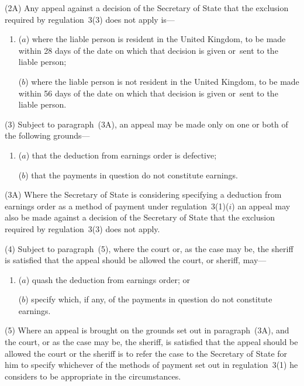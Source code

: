 \documentclass[12pt,a4paper]{article}
\begin{document}
(2A) Any appeal against a decision of the Secretary of State that the exclusion required by regulation~3(3) does not apply is—
\begin{enumerate}\item[]
($a$) where the liable person is resident in the United Kingdom, to be made within 28 days of the date on which that decision is given or~sent to the liable person;

($b$) where the liable person is not resident in the United Kingdom, to be made within 56 days of the date on which that decision is given or~sent to the liable person.
\end{enumerate}

(3) 
Subject to paragraph~(3A),  %
an appeal may be made only on one or both of the following grounds—
\begin{enumerate}\item[]
($a$) that the deduction from earnings order is defective;

($b$) that the payments in question do not constitute earnings.
\end{enumerate}

(3A) Where the Secretary of State is considering specifying a deduction from earnings order as a method of payment under regulation~3(1)($i$)  an appeal may also be made against a decision of the Secretary of State that the exclusion required by regulation~3(3) does not apply.

(4) 
Subject to paragraph~(5),  %
where the court or, as the case may be, the sheriff is satisfied that the appeal should be allowed the court, or sheriff, may—
\begin{enumerate}\item[]
($a$) quash the deduction from earnings order; or

($b$) specify which, if any, of the payments in question do not constitute earnings.\end{enumerate}

\begin{sloppypar}
(5) Where an appeal is brought on the grounds set out in paragraph~(3A), and the court, or as the case may be, the sheriff, is satisfied that the appeal should be allowed the court or the sheriff is to refer the case to the Secretary of State for him to specify whichever of the methods of payment set out in regulation~3(1) he considers to be appropriate in the circumstances.
\end{sloppypar}
\end{document}
